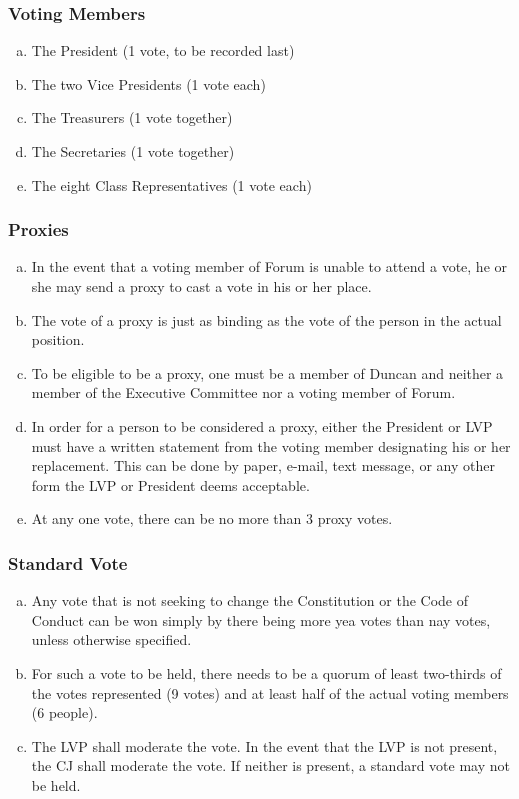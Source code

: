 \documentclass[USletter,12pt]{article}
\begin{document}
\begin{enumerate}[(a)]
\subsubsection{Voting Members}
\begin{enumerate}[(a)]
\item The President (1 vote, to be recorded last)
\item The two Vice Presidents (1 vote each)
\item The Treasurers (1 vote together)
\item The Secretaries (1 vote together)
\item The eight Class Representatives (1 vote each)
\end{enumerate}

\subsubsection{Proxies}
\begin{enumerate}[(a)]
\item In the event that a voting member of Forum is unable to attend a vote, he or she may send a proxy to cast a vote in his or her place.
\item The vote of a proxy is just as binding as the vote of the person in the actual position.
\item To be eligible to be a proxy, one must be a member of Duncan and neither a member of the Executive Committee nor a voting member of Forum.
\item In order for a person to be considered a proxy, either the President or LVP must have a written statement from the voting member designating his or her replacement.  This can be done by paper, e-mail, text message, or any other form the LVP or President deems acceptable.
\item At any one vote, there can be no more than 3 proxy votes.
\end{enumerate}

\subsubsection{Standard Vote}
\begin{enumerate}[(a)]
\item Any vote that is not seeking to change the Constitution or the Code of Conduct can be won simply by there being more yea votes than nay votes, unless otherwise specified.
\item For such a vote to be held, there needs to be a quorum of least two-thirds of the votes represented (9 votes) and at least half of the actual voting members (6 people).
\item The LVP shall moderate the vote.  In the event that the LVP is not present, the CJ shall moderate the vote.  If neither is present, a standard vote may not be held.
\end{enumerate}


\end{enumerate}
\end{document}
